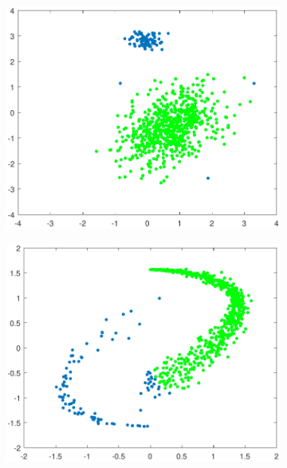 \documentclass[preprint,12pt]{elsarticle}
\begin{document}
\begin{figure}[!htb]
		\begin{subfigure}[b]{0.40\linewidth}
			\centering\includegraphics[width=1\linewidth]{figures/kcstep/c1output.pdf}
			\caption{\label{fig:kcstepc1}}
		\end{subfigure}
		\begin{subfigure}[b]{0.40\linewidth}
			\centering\includegraphics[width=1\linewidth]{figures/kcstep/c2output.pdf}
			\caption{\label{fig:kcstepc2}}
		\end{subfigure}
		\caption{
}
\end{figure}
\end{document}
